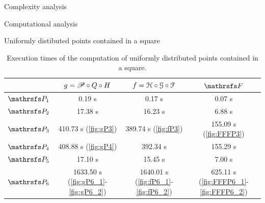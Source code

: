 \documentclass[11pt, a4paper, english, twoside, notitlepage, openright]{report}
\begin{document}
\begin{chapter}{Complexity analysis}
\begin{section}{Computational analysis}
\begin{subsection}{Uniformly distibuted points contained in a square}
\begin{table}[ht!]
\begin{center}
\begin{tabular}{c || c | c | c}
& $g = \P\circ Q \circ H$ & $f=\HH\circ\GG\circ\FF$ & $\FFF$ \\ \hline \hline
$\PP_1$ & 0.19 s & 0.17 s & 0.07 s \\ \hline
$\PP_2$ & 17.38 s & 16.23 s & 6.88 s \\ \hline
$\PP_3$ & 410.73 s (\ref{fig:gP3}) & 389.74 s (\ref{fig:fP3}) & 155.09 s (\ref{fig:FFFP3}) \\ \hline
$\PP_4$ & 408.88 s (\ref{fig:gP4}) & 392.34 s & 155.29 s \\ \hline
$\PP_5$ & 17.10 s & 15.45 s & 7.00 s \\ \hline
$\PP_6$ & 1633.50 s (\ref{fig:gP6_1}-\ref{fig:gP6_2}) & 1640.01 s (\ref{fig:fP6_1}-\ref{fig:fP6_2}) & 625.11 s  (\ref{fig:FFFP6_1}-\ref{fig:FFFP6_2}) \\
\end{tabular}
\caption[Execution times of the computation of points contained in a square.]{Execution times of the computation of uniformly distributed points contained in a square.}\label{tab:square}
\end{center}
\end{table}


\end{subsection}
\end{section}
\end{chapter}
\end{document}

